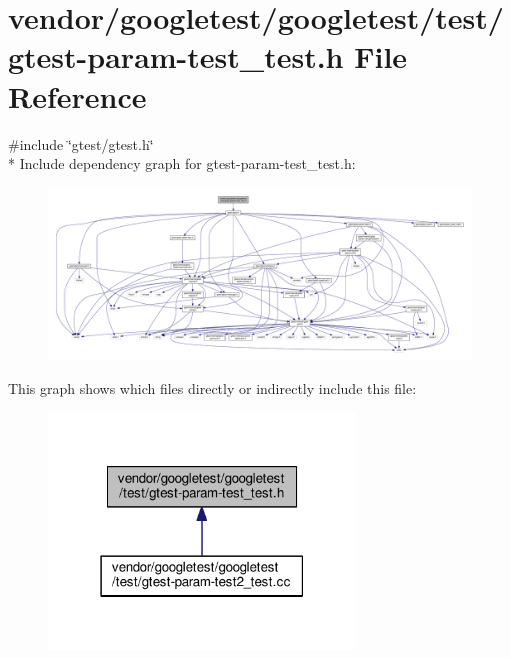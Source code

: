 \hypertarget{gtest-param-test__test_8h}{}\section{vendor/googletest/googletest/test/gtest-\/param-\/test\+\_\+test.h File Reference}
\label{gtest-param-test__test_8h}
{\ttfamily \#include \char`\"{}gtest/gtest.\+h\char`\"{}}\\*
Include dependency graph for gtest-\/param-\/test\+\_\+test.h\+:\nopagebreak
\begin{figure}[H]
\begin{center}
\leavevmode
\includegraphics[width=350pt]{gtest-param-test__test_8h__incl}
\end{center}
\end{figure}
This graph shows which files directly or indirectly include this file\+:\nopagebreak
\begin{figure}[H]
\begin{center}
\leavevmode
\includegraphics[width=231pt]{gtest-param-test__test_8h__dep__incl}
\end{center}
\end{figure}

